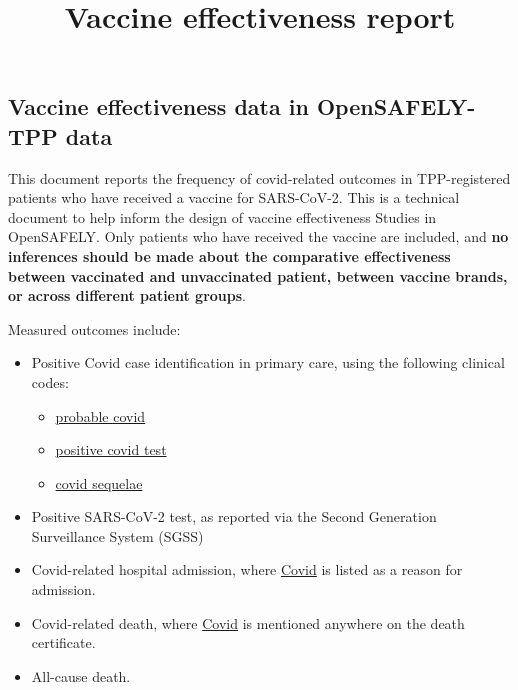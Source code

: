 \documentclass[
]{article}
\title{Vaccine effectiveness report}
\author{}
\date{\vspace{-2.5em}}
\providecommand{\tightlist}{%
  \setlength{\itemsep}{0pt}\setlength{\parskip}{0pt}}
\begin{document}
\maketitle

\hypertarget{vaccine-effectiveness-data-in-opensafely-tpp-data}{%
\subsection{Vaccine effectiveness data in OpenSAFELY-TPP
data}\label{vaccine-effectiveness-data-in-opensafely-tpp-data}}

This document reports the frequency of covid-related outcomes in
TPP-registered patients who have received a vaccine for SARS-CoV-2. This
is a technical document to help inform the design of vaccine
effectiveness Studies in OpenSAFELY. Only patients who have received the
vaccine are included, and \textbf{no inferences should be made about the
comparative effectiveness between vaccinated and unvaccinated patient,
between vaccine brands, or across different patient groups}.

Measured outcomes include:

\begin{itemize}
\tightlist
\item
  Positive Covid case identification in primary care, using the
  following clinical codes:

  \begin{itemize}
  \tightlist
  \item
    \href{https://codelists.opensafely.org/codelist/opensafely/covid-identification-in-primary-care-probable-covid-clinical-code/2020-07-16}{probable
    covid}
  \item
    \href{https://codelists.opensafely.org/codelist/opensafely/covid-identification-in-primary-care-probable-covid-positive-test/2020-07-16/}{positive
    covid test}
  \item
    \href{https://codelists.opensafely.org/codelist/opensafely/covid-identification-in-primary-care-probable-covid-sequelae/2020-07-16/}{covid
    sequelae}
  \end{itemize}
\item
  Positive SARS-CoV-2 test, as reported via the Second Generation
  Surveillance System (SGSS)
\item
  Covid-related hospital admission, where
  \href{https://codelists.opensafely.org/codelist/opensafely/covid-identification/2020-06-03/}{Covid}
  is listed as a reason for admission.
\item
  Covid-related death, where
  \href{https://codelists.opensafely.org/codelist/opensafely/covid-identification/2020-06-03/}{Covid}
  is mentioned anywhere on the death certificate.
\item
  All-cause death.
\end{itemize}
\end{document}

